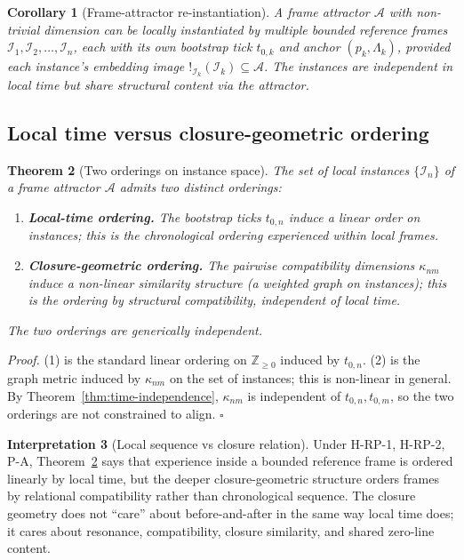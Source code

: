 \documentclass[11pt]{article}
\theoremstyle{plain}
\newtheorem{theorem}{Theorem}[section]
\newtheorem{corollary}[theorem]{Corollary}
\theoremstyle{definition}
\newtheorem{interpretation}[theorem]{Interpretation}
\theoremstyle{remark}
\newcommand{\Ical}{\mathcal{I}}
\begin{document}
\begin{corollary}[Frame-attractor re-instantiation]\label{cor:reinstantiation}
A frame attractor $\mathcal{A}$ with non-trivial dimension can be locally instantiated by multiple bounded reference frames $\Ical_1, \Ical_2, \ldots, \Ical_n$, each with its own bootstrap tick $t_{0,k}$ and anchor $(p_k, \Lambda_k)$, provided each instance's embedding image $!_{\Ical_k}(\Ical_k) \subseteq \mathcal{A}$. The instances are independent in local time but share structural content via the attractor.
\end{corollary}

\subsection{Local time versus closure-geometric ordering}

\begin{theorem}[Two orderings on instance space]\label{thm:two-orderings}
The set of local instances $\{\Ical_n\}$ of a frame attractor $\mathcal{A}$ admits two distinct orderings:
\begin{enumerate}[leftmargin=2em]
\item \textbf{Local-time ordering.} The bootstrap ticks $t_{0,n}$ induce a linear order on instances; this is the chronological ordering experienced within local frames.
\item \textbf{Closure-geometric ordering.} The pairwise compatibility dimensions $\kappa_{nm}$ induce a non-linear similarity structure (a weighted graph on instances); this is the ordering by structural compatibility, independent of local time.
\end{enumerate}
The two orderings are generically independent.
\end{theorem}

\noindent\emph{Proof.} (1) is the standard linear ordering on $\mathbb{Z}_{\geq 0}$ induced by $t_{0,n}$. (2) is the graph metric induced by $\kappa_{nm}$ on the set of instances; this is non-linear in general. By Theorem~\ref{thm:time-independence}, $\kappa_{nm}$ is independent of $t_{0,n}, t_{0,m}$, so the two orderings are not constrained to align. \hfill$\square$

\begin{interpretation}[Local sequence vs closure relation]\label{int:two-orderings-bio}
Under H-RP-1, H-RP-2, P-A, Theorem~\ref{thm:two-orderings} says that experience inside a bounded reference frame is ordered linearly by local time, but the deeper closure-geometric structure orders frames by relational compatibility rather than chronological sequence. The closure geometry does not ``care'' about before-and-after in the same way local time does; it cares about resonance, compatibility, closure similarity, and shared zero-line content.
\end{interpretation}
\end{document}
